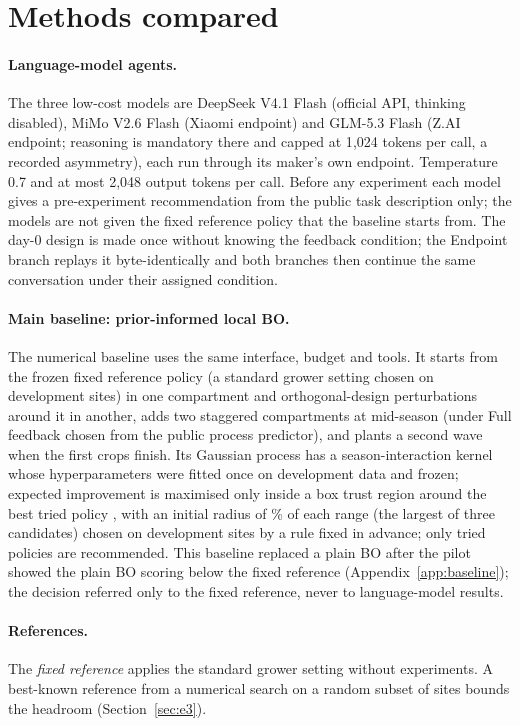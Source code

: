 \section{Methods compared}
\paragraph{Language-model agents.} The three low-cost models are DeepSeek V4.1 Flash (official API, thinking disabled), MiMo V2.6 Flash (Xiaomi endpoint) and GLM-5.3 Flash (Z.AI endpoint; reasoning is mandatory there and capped at 1{,}024 tokens per call, a recorded asymmetry), each run through its maker's own endpoint. Temperature 0.7 and at most 2{,}048 output tokens per call. Before any experiment each model gives a pre-experiment recommendation from the public task description only; the models are not given the fixed reference policy that the baseline starts from. The day-0 design is made once without knowing the feedback condition; the Endpoint branch replays it byte-identically and both branches then continue the same conversation under their assigned condition.

\paragraph{Main baseline: prior-informed local BO.} The numerical baseline uses the same interface, budget and tools. It starts from the frozen fixed reference policy (a standard grower setting chosen on development sites) in one compartment and orthogonal-design perturbations around it in another, adds two staggered compartments at mid-season (under Full feedback chosen from the public process predictor), and plants a second wave when the first crops finish. Its Gaussian process has a season-interaction kernel whose hyperparameters were fitted once on development data and frozen; expected improvement is maximised only inside a box trust region around the best tried policy \citep[TuRBO rules,][]{eriksson2019turbo}, with an initial radius of \% of each range (the largest of three candidates) chosen on development sites by a rule fixed in advance; only tried policies are recommended. This baseline replaced a plain BO after the pilot showed the plain BO scoring below the fixed reference (Appendix~\ref{app:baseline}); the decision referred only to the fixed reference, never to language-model results.

\paragraph{References.} The \emph{fixed reference} applies the standard grower setting without experiments. A best-known reference from a numerical search on a random subset of sites bounds the headroom (Section~\ref{sec:e3}).
